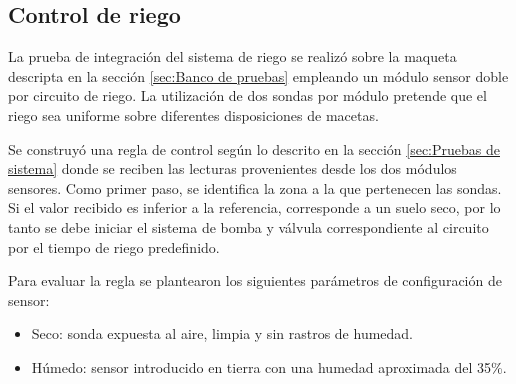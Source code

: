 

\subsection{Control de riego}
\label{sec:Control de riego}

La prueba de integración del sistema de riego se realizó sobre la maqueta descripta en la sección  \ref{sec:Banco de pruebas} empleando un módulo sensor doble por circuito de riego. La utilización de dos sondas por módulo pretende que el riego sea uniforme sobre diferentes disposiciones de macetas. 

Se construyó una regla de control según lo descrito en la sección \ref{sec:Pruebas de sistema} donde se reciben las lecturas provenientes desde los dos módulos sensores. Como primer paso, se identifica la zona a la que pertenecen las sondas. Si el valor recibido es inferior a la referencia, corresponde a un suelo seco, por lo tanto se debe iniciar el sistema de bomba y válvula correspondiente al circuito por el tiempo de riego predefinido.


Para evaluar la regla se plantearon los siguientes parámetros de configuración de sensor:
\begin{itemize}
\item Seco: sonda expuesta al aire, limpia y sin rastros de humedad.
\item Húmedo: sensor introducido en tierra con una humedad aproximada del 35\%.
\end{itemize}

